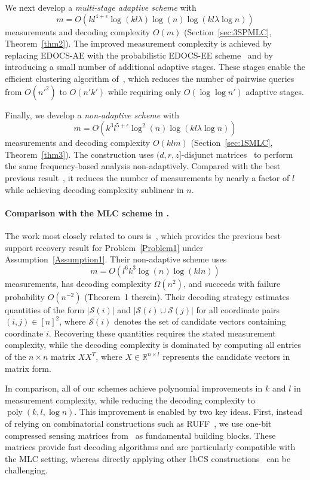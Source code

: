 \documentclass[10pt,a4paper]{amsart}
\newcommand\mc{\mathcal}
\begin{document}
We next develop a {\em multi-stage adaptive scheme} with
\[
m=O\!\left(kl^{4+\epsilon}\log(kl\lambda)\log(n)\log(kl\lambda\log n)\right)
\]
measurements and decoding complexity $O(m)$ (Section~\ref{sec:3SPMLC}, Theorem~\ref{thm2}). The improved measurement complexity is achieved by replacing EDOCS-AE with the probabilistic EDOCS-EE scheme~\cite{li2025support} and by introducing a small number of additional adaptive stages. These stages enable the efficient clustering algorithm of~\cite{black2025learning}, which reduces the number of pairwise queries from $O(n'^2)$ to $O(n'k')$ while requiring only $O(\log\log n')$ adaptive stages.

Finally, we develop a {\em non-adaptive scheme} with
\[
m=O\!\left(k^3l^{5+\epsilon}\log^2(n)\log(kl\lambda\log n)\right)
\]
measurements and decoding complexity $O(klm)$ (Section~\ref{sec:1SMLC}, Theorem~\ref{thm3}). The construction uses $(d,r,z]$-disjunct matrices~\cite{chen2008upper} to perform the same frequency-based analysis non-adaptively. Compared with the best previous result~\cite{gandikota2020recovery}, it reduces the number of measurements by nearly a factor of $l$ while achieving decoding complexity sublinear in $n$.

\paragraph{Comparison with the MLC scheme in \cite{gandikota2020recovery}.}
The work most closely related to ours is~\cite{gandikota2020recovery}, which provides the previous best support recovery result for Problem~\ref{Problem1} under Assumption~\ref{Assumption1}. Their non-adaptive scheme uses
\[
m=O(l^6k^3\log(n)\log(kln))
\]
measurements, has decoding complexity $\Omega(n^2)$, and succeeds with failure probability $O(n^{-2})$ (Theorem~1 therein). Their decoding strategy estimates quantities of the form $|\mc{S}(i)|$ and $|\mc{S}(i)\cup\mc{S}(j)|$ for all coordinate pairs $(i,j)\in[n]^2$, where $\mc{S}(i)$ denotes the set of candidate vectors containing coordinate $i$. Recovering these quantities requires the stated measurement complexity, while the decoding complexity is dominated by computing all entries of the $n\times n$ matrix $XX^T$, where $X\in\mathbb{R}^{n\times l}$ represents the candidate vectors in matrix form.

In comparison, all of our schemes achieve polynomial improvements in $k$ and $l$ in measurement complexity, while reducing the decoding complexity to $\operatorname{poly}(k,l,\log n)$. This improvement is enabled by two key ideas. First, instead of relying on combinatorial constructions such as RUFF~\cite{acharya2017improved}, we use one-bit compressed sensing matrices from~\cite{li2025support} as fundamental building blocks. These matrices provide fast decoding algorithms and are particularly compatible with the MLC setting, whereas directly applying other 1bCS constructions~\cite{acharya2017improved,matsumoto2023improved,matsumoto2024robust} can be challenging.
\end{document}
